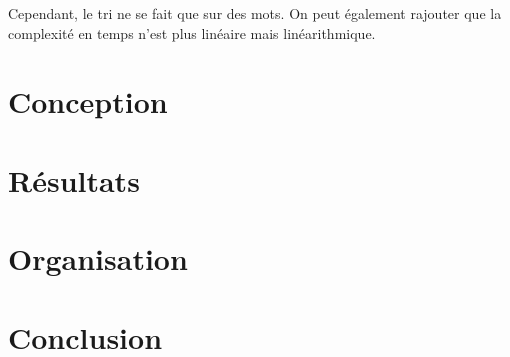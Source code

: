 \documentclass[11pt]{article}
\begin{document}
Cependant, le tri ne se fait que sur des mots. On peut également rajouter que la complexité en temps n'est plus linéaire mais linéarithmique. 

\newpage






\section{Conception}
\newpage 

\section{Résultats}
\newpage 
\section{Organisation}
\newpage 
\section{Conclusion}

\newpage
%
%
\end{document}
